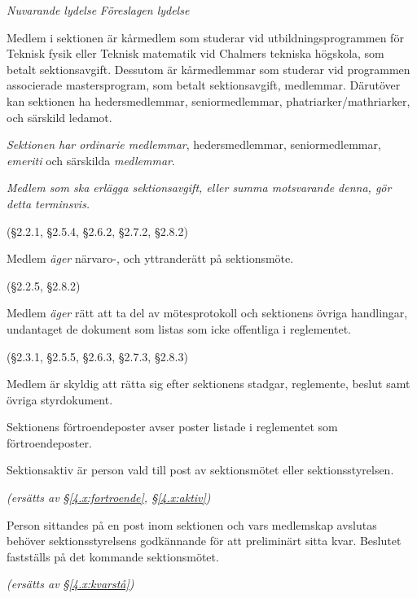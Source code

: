 \documentclass{article}
\newenvironment{lydelse}
    {\begin{paracol}{2}%
        \emph{Nuvarande lydelse}%
        \switchcolumn%
        \emph{Föreslagen lydelse}%
    \end{paracol}%
    \begin{enumerate}[label=\thesubsection.\arabic*]%
    \begin{paracol}{2}%
    }{\end{paracol}\end{enumerate}}
\begin{document}
\begin{lydelse}
    \item Medlem i sektionen är kårmedlem som studerar vid utbildningsprogrammen för Teknisk fysik eller Teknisk matematik vid Chalmers tekniska högskola, som betalt sektionsavgift. Dessutom är kårmedlemmar som studerar vid programmen associerade mastersprogram, som betalt sektionsavgift, medlemmar. Därutöver kan sektionen ha hedersmedlemmar, seniormedlemmar, phatri\-arker/\-mathri\-arker, och särskild ledamot.
    
  \switchcolumn
  \setcounter{enumi}{0}
    \item \emph{Sektionen har ordinarie medlemmar}, hedersmedlemmar,
      seniormedlemmar, \emph{emeriti} och särskilda \emph{medlemmar}.
    
  \switchcolumn*
  \switchcolumn
    \item \emph{Medlem som ska erlägga sektionsavgift, eller summa motsvarande
      denna, gör detta terminsvis.}

  \switchcolumn*
    (\S 2.2.1, \S 2.5.4, \S 2.6.2, \S 2.7.2, \S 2.8.2)
  \switchcolumn
    \item Medlem \emph{äger} närvaro-, och yttranderätt på sektionsmöte.
      \label{2.1:närvaro}
    
  \switchcolumn*
    (\S 2.2.5, \S 2.8.2)
  \switchcolumn
    \item Medlem \emph{äger} rätt att ta del av mötesprotokoll och sektionens
      övriga handlingar, undantaget de dokument som listas som icke offentliga
      i reglementet.
      \label{2.1:offentlighet}
    
  \switchcolumn*
    (\S 2.3.1, \S 2.5.5, \S 2.6.3, \S 2.7.3, \S 2.8.3)

  \switchcolumn
    \item Medlem är skyldig att rätta sig efter sektionens stadgar,
      regle\-mente, beslut samt övriga styrdokument.
      \label{2.1:skyldig}
    
  \switchcolumn*
  \setcounter{subsection}{4}
  \setcounter{enumi}{0}
    \item Sektionens förtroendeposter avser poster listade i reglementet som
      förtroendeposter.
    
    \item Sektionsaktiv är person vald till post av sektionsmötet eller
      sektionsstyrelsen.
    
  \switchcolumn
    \emph{(ersätts av \S \ref{4.x:fortroende}, \S \ref{4.x:aktiv})}

  \switchcolumn*
  \setcounter{subsection}{1}
  \setcounter{enumi}{1}
    \item Person sittandes på en post inom sektionen och vars medlemskap
      avslutas behöver sektionsstyrelsens godkännande för att preliminärt sitta
      kvar. Beslutet fastställs på det kommande sektionsmötet.

  \switchcolumn
    \emph{(ersätts av \S\ref{4.x:kvarstå})} %
\end{lydelse}
\end{document}
